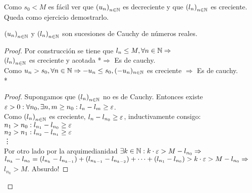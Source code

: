 Como \(s_0 < M\) es fácil ver que \({(u_n)}_{n \in \mathbb{N}} \) es decreciente y que \({(l_n)}_{n \in \mathbb{N}} \) es creciente. Queda como ejercicio demostrarlo.
\begin{lemma}
	\({(u_n)}_{n \in \mathbb{N}} \) y \({(l_n)}_{n \in \mathbb{N}} \) son sucesiones de Cauchy de números reales.
	\begin{proof}
		Por construcción se tiene que \(l_n \leq M, \forall n \in \mathbb{N} \Rightarrow \) \\
		\({(l_n)}_{n \in \mathbb{N}} \) es creciente y acotada *\(\Rightarrow \) Es de cauchy. \\

		Como \(u_n > s_0, \forall n \in \mathbb{N} \Rightarrow -u_n \leq s_0, (-u_n)_{n \in \mathbb{N}} \) es creciente \(\Rightarrow \) Es de cauchy. \\

		* \begin{proof}
			Supongamos que \({(l_n)}_{n \in \mathbb{N}} \) no es de Cauchy. Entonces existe \(\varepsilon > 0 : \forall n_0, \exists n, m \geq n_0 : l_n - l_m \geq \varepsilon \). \\
			Como \({(l_n)}_{n \in \mathbb{N}} \) es creciente, \(l_n - l_{n_0} \geq \varepsilon \), inductivamente consigo: \\
			\(n_1 > n_0 : l_{n_1} - l_{n_0} \geq \varepsilon \) \\
			\(n_2 > n_1 : l_{n_2} - l_{n_1} \geq \varepsilon \) \\
			\vdots \\

			Por otro lado por la arquimedianidad \(\exists k \in \mathbb{N} : k \cdot \varepsilon > M - l_{n_0} \Rightarrow \) \\
			\(l_{n_k} - l_{n_0} = (l_{n_k} - l_{n_{k-1}}) + (l_{n_{k-1}} - l_{n_{k-2}}) + \cdots + (l_{n_1} - l_{n_0}) > k \cdot \varepsilon > M - l_{n_0} \Rightarrow \) \\
			\(l_{n_k} > M\). Absurdo!
		\end{proof}
	\end{proof}
\end{lemma}

